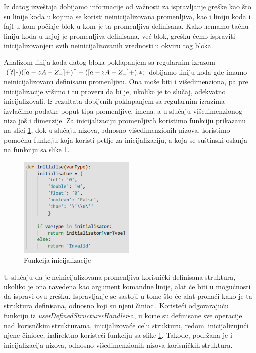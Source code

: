 \documentclass[12pt,oneside]{memoir}
\theoremstyle{plain}
\theoremstyle{definition}
\begin{document}
Iz datog izveštaja dobijamo informacije od važnosti za ispravljanje greške kao što su linije koda u kojima se koristi neinicijalizovana promenljiva, kao i liniju koda i fajl u kom počinje blok u kom je ta promenljiva definisana. Kako nemamo tačnu liniju koda u kojoj je promenljiva definisana, već blok, grešku ćemo ispraviti inicijalizovanjem svih neinicijalizovanih vrednosti u okviru tog bloka. 

Analizom linija koda datog bloka poklapanjem sa regularnim izrazom $ ([ \\t]*)([a-zA-Z_-]+)[ ]+([a-zA-Z_-]+).*; $ dobijamo liniju koda gde imamo neinicijalizovanu definisanu promenljivu. Ona može biti i višedimenziona, pa pre inicijalizacije vršimo i tu proveru da bi je, ukoliko je to slučaj, adekvatno inicijalizovali. Iz rezultata dobijenih poklapanjem sa regularnim izrazima izvlačimo podatke poput tipa promenljive, imena, a u slučaju višedimenzionog niza još i dimenzije. Za inicijalizaciju promenljivih koristimo funkciju prikazanu na slici \ref{fig:slika4.6}, dok u slučaju nizova, odnosno višedimenzionih nizova, koristimo pomoćnu funkciju koja koristi petlje za inicijalizaciju, a koja se suštinski oslanja na funkciju sa slike \ref{fig:slika4.6}.

\begin{figure}[!ht]
  \centering
  \includegraphics[width=0.5\textwidth]{InitialisationFunction.png}
  \caption{Funkcija inicijalizacije}
  \label{fig:slika4.6}
\end{figure} 

U slučaju da je neinicijalizovana promenljiva korisnički definisana struktura, ukoliko je ona navedena kao argument komandne linije, alat će biti u mogućnosti da ispravi ovu grešku. Ispravljanje se sastoji u tome što će alat pronaći kako je ta struktura definisana, odnosno koji su njeni činioci. Koristeći odgovarajuću funkciju iz \textit{userDefinedStructuresHandler}-a, u kome su definisane sve operacije nad korisnčkim strukturama, inicijalizovaće celu strukturu, redom, inicijalizujući njene činioce, indirektno koristeći funkciju sa slike \ref{fig:slika4.6}. Takođe, podržana je i inicijalizacija nizova, odnosno višedimenzionih nizova korisničkih struktura. 
\end{document}
